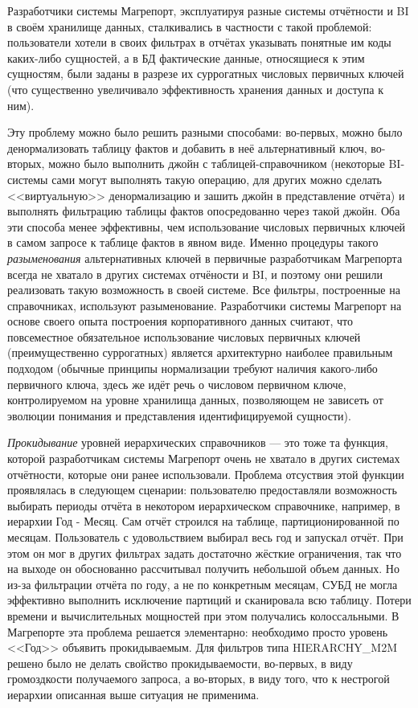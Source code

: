 \documentclass[../user-manual.tex]{subfiles}
\begin{document}
	\begin{concept}
		Разработчики системы Магрепорт, эксплуатируя разные системы отчётности и BI в своём хранилище данных, сталкивались в частности с такой проблемой: пользователи хотели в своих фильтрах в отчётах указывать понятные им коды каких-либо сущностей, а в БД фактические данные, относящиеся к этим сущностям, были заданы в разрезе их суррогатных числовых первичных ключей (что существенно увеличивало эффективность хранения данных и доступа к ним). 

		Эту проблему можно было решить разными способами: во-первых, можно было денормализовать таблицу фактов и добавить в неё альтернативный ключ, во-вторых, можно было выполнить джойн с таблицей-справочником (некоторые BI-системы сами могут выполнять такую операцию, для других можно сделать <<виртуальную>> денормализацию и зашить джойн в представление отчёта) и выполнять фильтрацию таблицы фактов опосредованно через такой джойн. Оба эти способа менее эффективны, чем использование числовых первичных ключей в самом запросе к таблице фактов в явном виде. Именно процедуры такого \textit{разыменования} альтернативных ключей в первичные разработчикам Магрепорта всегда не хватало в других системах отчёности и BI, и поэтому они решили реализовать такую возможность в своей системе. Все фильтры, построенные на справочниках, используют разыменование. Разработчики системы Магрепорт на основе своего опыта построения корпоративного данных считают, что повсеместное обязательное использование числовых первичных ключей (преимущественно суррогатных) является архитектурно наиболее правильным подходом (обычные принципы нормализации требуют наличия какого-либо первичного ключа, здесь же идёт речь о числовом первичном ключе, контролируемом на уровне хранилища данных, позволяющем не зависеть от эволюции понимания и представления идентифицируемой сущности).

		\textit{Прокидывание} уровней иерархических справочников --- это тоже та функция, которой разработчикам системы Магрепорт очень не хватало в других системах отчётности, которые они ранее использовали. Проблема отсуствия этой функции проявлялась в следующем сценарии: пользователю предоставляли возможность выбирать периоды отчёта в некотором иерархическом справочнике, например, в иерархии Год - Месяц. Сам отчёт строился на таблице, партиционированной по месяцам. Пользователь с удовольствием выбирал весь год и запускал отчёт. При этом он мог в других фильтрах задать достаточно жёсткие ограничения, так что на выходе он обоснованно рассчитывал получить небольшой объем данных. Но из-за фильтрации отчёта по году, а не по конкретным месяцам, СУБД не могла эффективно выполнить исключение партиций и сканировала всю таблицу. Потери времени и вычислительных мощностей при этом получались колоссальными. В Магрепорте эта проблема решается элементарно: необходимо просто уровень <<Год>> объявить прокидываемым. Для фильтров типа HIERARCHY\_M2M решено было не делать свойство прокидываемости, во-первых, в виду громоздкости получаемого запроса, а во-вторых, в виду того, что к нестрогой иерархии описанная выше ситуация не применима.


\end{concept}
\end{document}
